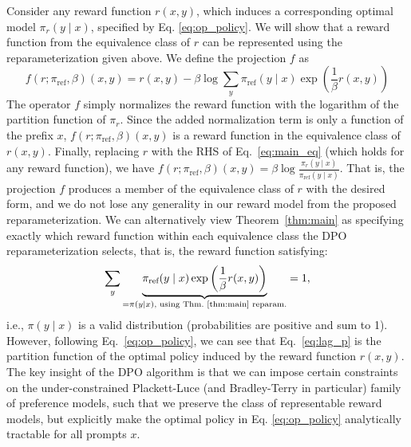 \documentclass{article}
\newenvironment{sproof}{%
  \renewcommand{\proofname}{Proof Sketch}\proof}{\endproof}
\newcommand{\piref}{\pi_\text{ref}}
\begin{document}
\begin{sproof}
    Consider any reward function $r(x, y)$, which induces a corresponding optimal model $\pi_r(y \mid x)$, specified by Eq. \ref{eq:op_policy}. We will show that a reward function from the equivalence class of $r$ can be represented using the reparameterization given above. We define the projection $f$ as  
\begin{equation}
    f(r; \piref, \beta)(x, y) = r(x, y) - \beta\log\sum_{y}\piref(y\mid x)\exp\left(\frac{1}{\beta}r(x, y)\right)
\end{equation}
The operator $f$ simply normalizes the reward function with the logarithm of the partition function of $\pi_r$. Since the added normalization term is only a function of the prefix $x$, $f(r; \piref, \beta)(x, y) $ is a reward function in the equivalence class of $r(x, y)$. Finally, replacing $r$ with the RHS of Eq.~\ref{eq:main_eq} (which holds for any reward function), we have $f(r; \piref, \beta)(x, y) = \beta \log \frac{\pi_r(y\mid x)}{\piref(y\mid x)}$. That is, the projection $f$ produces a member of the equivalence class of $r$ with the desired form, and we do not lose any generality in our reward model from the proposed reparameterization.
\end{sproof}
We can alternatively view Theorem~\ref{thm:main} as specifying exactly which reward function within each equivalence class the DPO reparameterization selects, that is, the reward function satisfying:
\begin{equation}\label{eq:lag_p}
     \sum_{y}\underbrace{\piref(y\mid x)\exp\left(\frac{1}{\beta}r(x, y)\right)}_{=\pi(y\mid x)\text{, using Thm.~\ref{thm:main} reparam.}} = 1,
\end{equation}
i.e., $\pi(y\mid x)$ is a valid distribution (probabilities are positive and sum to 1).
However, following Eq.~\ref{eq:op_policy}, we can see that Eq.~\ref{eq:lag_p} is the partition function of the optimal policy induced by the reward function $r(x, y)$.
The key insight of the DPO algorithm is that we can impose certain constraints on the under-constrained Plackett-Luce (and Bradley-Terry in particular) family of preference models, such that we preserve the class of representable reward models, but explicitly make the optimal policy in Eq. \ref{eq:op_policy} analytically tractable for all prompts $x$.
\end{document}
